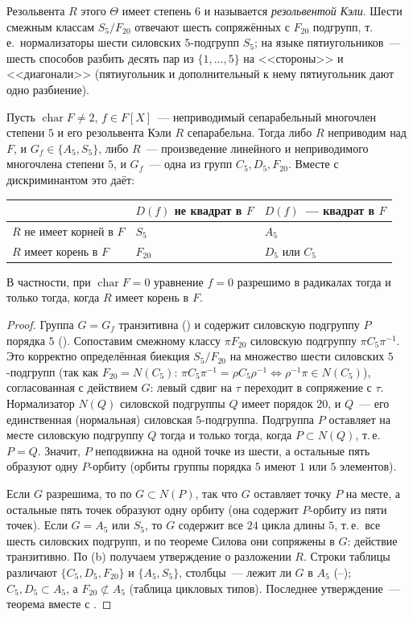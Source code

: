 Резольвента $R$ этого $\Theta$ имеет степень $6$ и называется \emph{резольвентой Кэли}. Шести смежным классам $S_5/F_{20}$
отвечают шесть сопряжённых с $F_{20}$ подгрупп, т.\,е.\ нормализаторы шести силовских $5$-подгрупп $S_5$; на языке
пятиугольников~--- шесть способов разбить десять пар из $\{1,\dots,5\}$ на <<стороны>> и <<диагонали>> (пятиугольник и
дополнительный к нему пятиугольник дают одно разбиение).

\begin{theorem}[4.18e: Кэли]
Пусть $\operatorname{char}F\ne2$, $f\in F[X]$~--- неприводимый сепарабельный многочлен степени $5$ и его резольвента Кэли
$R$ сепарабельна. Тогда либо $R$ неприводим над $F$, и $G_f\in\{A_5,S_5\}$, либо $R$~--- произведение линейного и
неприводимого многочлена степени $5$, и $G_f$~--- одна из групп $C_5,D_5,F_{20}$. Вместе с дискриминантом это даёт:
\begin{center}
\small
\begin{tabular}{@{}lll@{}}
\toprule
& $D(f)$ не квадрат в $F$ & $D(f)$~--- квадрат в $F$\\
\midrule
$R$ не имеет корней в $F$ & $S_5$ & $A_5$\\
$R$ имеет корень в $F$ & $F_{20}$ & $D_5$ или $C_5$\\
\bottomrule
\end{tabular}
\end{center}
В частности, при $\operatorname{char}F=0$ уравнение $f=0$ разрешимо в радикалах тогда и только тогда, когда $R$ имеет
корень в $F$.
\end{theorem}

\begin{proof}
Группа $G=G_f$ транзитивна () и содержит силовскую подгруппу $P$ порядка $5$ (). Сопоставим смежному классу
$\pi F_{20}$ силовскую подгруппу $\pi C_5\pi^{-1}$. Это корректно определённая биекция $S_5/F_{20}$ на множество шести
силовских $5$-подгрупп (так как $F_{20}=N(C_5)$: $\pi C_5\pi^{-1}=\rho C_5\rho^{-1}\iff\rho^{-1}\pi\in N(C_5)$), согласованная с
действием $G$: левый сдвиг на $\tau$ переходит в сопряжение с $\tau$. Нормализатор $N(Q)$ силовской подгруппы $Q$ имеет
порядок $20$, и $Q$~--- его единственная (нормальная) силовская $5$-подгруппа. Подгруппа $P$ оставляет на месте силовскую подгруппу $Q$ тогда и только тогда, когда $P\subset N(Q)$, т.\,е.\
$P=Q$. Значит, $P$ неподвижна на одной точке из шести, а остальные пять образуют одну $P$-орбиту (орбиты группы порядка $5$
имеют $1$ или $5$ элементов).

Если $G$ разрешима, то по  $G\subset N(P)$, так что $G$ оставляет точку $P$ на месте, а остальные пять точек
образуют одну орбиту (она содержит $P$-орбиту из пяти точек). Если $G=A_5$ или $S_5$, то $G$ содержит все $24$ цикла длины
$5$, т.\,е.\ все шесть силовских подгрупп, и по теореме Силова они сопряжены в $G$: действие транзитивно. По \rf{4.18c}(b)
получаем утверждение о разложении $R$. Строки таблицы различают $\{C_5,D_5,F_{20}\}$ и $\{A_5,S_5\}$, столбцы~--- лежит ли
$G$ в $A_5$ (\rf{4.1}--\rf{4.5}); $C_5,D_5\subset A_5$, а $F_{20}\not\subset A_5$ (таблица цикловых типов). Последнее утверждение~---
теорема \rf{5.34} вместе с \rf{4.18a}.
\end{proof}

